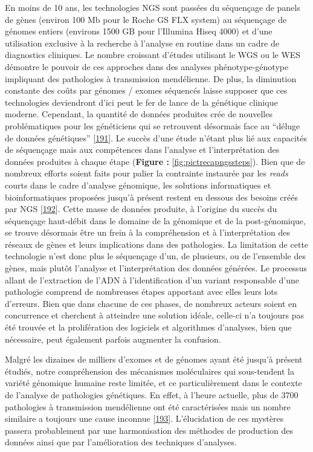 \documentclass[12pt,a4paper,twoside]{ugathesis}
\theoremstyle{definition}
\theoremstyle{definition}
\theoremstyle{definition}
\theoremstyle{remark}
\begin{document}
En moins de 10 ans, les technologies NGS sont passées du séquençage de
panels de gènes (environ 100 Mb pour le Roche GS FLX system) au
séquençage de génomes entiers (environs 1500 GB pour l'Illumina Hiseq
4000) et d'une utilisation exclusive à la recherche à l'analyse en
routine dans un cadre de diagnostics cliniques. Le nombre croissant
d'études utilisant le WGS ou le WES démontre le pouvoir de ces approches
dans des analyses phénotype-génotype impliquant des pathologies à
transmission mendélienne. De plus, la diminution constante des coûts par
génomes / exomes séquencés laisse supposer que ces technologies
deviendront d'ici peut le fer de lance de la génétique clinique moderne.
Cependant, la quantité de données produites crée de nouvelles
problématiques pour les généticiens qui se retrouvent désormais face au
``déluge de données génétiques''
{[}\protect\hyperlink{ref-Schatz2013}{191}{]}. Le succès d'une étude
n'étant plus lié aux capacités de séquençage mais aux compétences dans
l'analyse et l'interprétation des données produites à chaque étape
(\textbf{Figure :} \ref{fig:pictrecapngssteps}). Bien que de nombreux
efforts soient faits pour palier la contrainte instaurée par les
\emph{reads} courts dans le cadre d'analyse génomique, les solutions
informatiques et bioinformatiques proposées jusqu'à présent restent en
dessous des besoins créés par NGS
{[}\protect\hyperlink{ref-McPherson2009}{192}{]}. Cette masse de données
produite, à l'origine du succès du séquençage haut-débit dans le domaine
de la génomique et de la post-génomique, se trouve désormais être un
frein à la compréhension et à l'interprétation des réseaux de gènes et
leurs implications dans des pathologies. La limitation de cette
technologie n'est donc plus le séquençage d'un, de plusieurs, ou de
l'ensemble des gènes, mais plutôt l'analyse et l'interprétation des
données générées. Le processus allant de l'extraction de l'ADN à
l'identification d'un variant responsable d'une pathologie comprend de
nombreuses étapes apportant avec elles leurs lots d'erreurs. Bien que
dans chacune de ces phases, de nombreux acteurs soient en concurrence et
cherchent à atteindre une solution idéale, celle-ci n'a toujours pas été
trouvée et la prolifération des logiciels et algorithmes d'analyses,
bien que nécessaire, peut également parfois augmenter la confusion.

Malgré les dizaines de milliers d'exomes et de génomes ayant été jusqu'à
présent étudiés, notre compréhension des mécanismes moléculaires qui
sous-tendent la variété génomique humaine reste limitée, et ce
particulièrement dans le contexte de l'analyse de pathologies
génétiques. En effet, à l'heure actuelle, plus de 3700 pathologies à
transmission mendélienne ont été caractérisées mais un nombre similaire
a toujours une cause inconnue
{[}\protect\hyperlink{ref-Amberger2011}{193}{]}. L'élucidation de ces
mystères passera probablement par une harmonisation des méthodes de
production des données ainsi que par l'amélioration des techniques
d'analyses.
\end{document}
